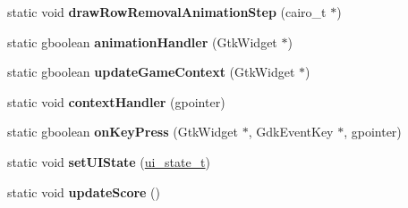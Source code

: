\begin{DoxyCompactItemize}
static void {\bfseries draw\+Row\+Removal\+Animation\+Step} (cairo\+\_\+t $\ast$)
\item 
\mbox{\label{classTetreesUI_a5b96d12dcb64cd2d8b76ec7feeb9e80b}} 
static gboolean {\bfseries animation\+Handler} (Gtk\+Widget $\ast$)
\item 
\mbox{\label{classTetreesUI_a80d2a8dc3841f2285eb22a5238600df7}} 
static gboolean {\bfseries update\+Game\+Context} (Gtk\+Widget $\ast$)
\item 
\mbox{\label{classTetreesUI_aecd0c6b7dad0f9524673711db8364cd6}} 
static void {\bfseries context\+Handler} (gpointer)
\item 
\mbox{\label{classTetreesUI_ad940ec71d761d3234ee3cef397434784}} 
static gboolean {\bfseries on\+Key\+Press} (Gtk\+Widget $\ast$, Gdk\+Event\+Key $\ast$, gpointer)
\item 
\mbox{\label{classTetreesUI_a195806825b5469dcc99fbca5d14af94f}} 
static void {\bfseries set\+U\+I\+State} (\hyperlink{TetreesDefs_8hpp_ab583135648b1264a9f7817709c4dbd3e}{ui\+\_\+state\+\_\+t})
\item 
\mbox{\label{classTetreesUI_ac41bb9dc9af1d051c54dd5f2dcf224a9}} 
static void {\bfseries update\+Score} ()
\end{DoxyCompactItemize}
